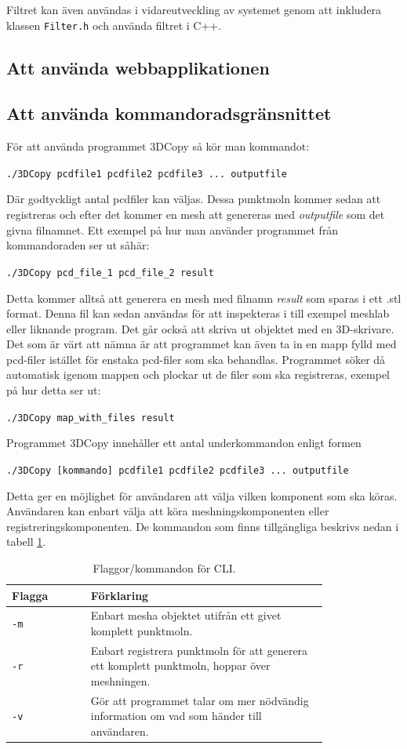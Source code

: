 \documentclass[a4paper,titlepage,12pt]{article}
\begin{document}
	Filtret kan även användas i vidareutveckling av systemet genom att inkludera klassen \texttt{Filter.h} och använda filtret i C++.
	
	\subsection{Att använda webbapplikationen}
	
	\subsection{Att använda kommandoradsgränsnittet}
		För att använda programmet 3DCopy så kör man kommandot:
		
		\texttt{./3DCopy pcdfile1 pcdfile2 pcdfile3 ... outputfile}
		
		Där godtyckligt antal pcdfiler kan väljas. Dessa punktmoln kommer sedan att registreras och efter det kommer en mesh att genereras med \textit{outputfile} som det givna filnamnet. Ett exempel på hur man använder programmet från kommandoraden ser ut såhär:
		
		\texttt{./3DCopy pcd\_file\_1 pcd\_file\_2 result}
		
		Detta kommer alltså att generera en mesh med filnamn \textit{result} som sparas i ett .stl format. Denna fil kan sedan användas för att inspekteras i till exempel meshlab eller liknande program. Det går också att skriva ut objektet med en 3D-skrivare. Det som är värt att nämna är att programmet kan även ta in en mapp fylld med pcd-filer istället för enstaka pcd-filer som ska behandlas. Programmet söker då automatisk igenom mappen och plockar ut de filer som ska registreras, exempel på hur detta ser ut:
		
		\texttt{./3DCopy map\_with\_files result}
		
		Programmet 3DCopy innehåller ett antal underkommandon enligt formen
		
		\texttt{./3DCopy [kommando] pcdfile1 pcdfile2 pcdfile3 ... outputfile}
		
		Detta ger en möjlighet för användaren att välja vilken komponent som ska köras. Användaren kan enbart välja att köra meshningskomponenten eller registreringskomponenten. De kommandon som finns tillgängliga beskrivs nedan i tabell \ref{tab:flaggor_cli}.
		
		\begin{table}[h!]
			\centering
			\caption{Flaggor/kommandon för CLI.}
			\label{tab:flaggor_cli}
			
			\begin{tabular}{p{0.2\linewidth}p{0.6\linewidth}}
				Flagga & Förklaring \\
				\hline
				\texttt{-m} & Enbart mesha objektet utifrån ett givet komplett punktmoln. \\
				\hline
				\texttt{-r} & Enbart registrera punktmoln för att generera ett komplett punktmoln, hoppar över meshningen. \\
				\hline
				\texttt{-v} & Gör att programmet talar om mer nödvändig information om vad som händer till användaren. \\
				\hline
			\end{tabular}
		\end{table}	
		
\end{document}
